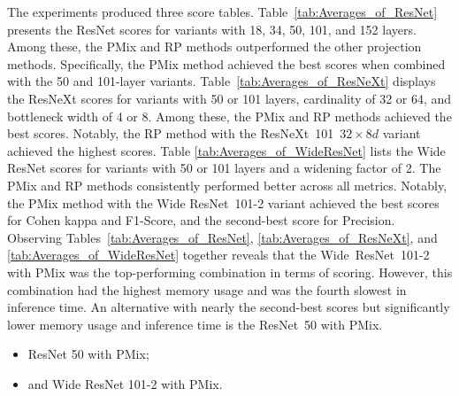 The experiments produced three score tables.
Table~\ref{tab:Averages_of_ResNet} presents the ResNet scores for variants with 18, 34, 50, 101, and 152 layers. Among these, the \gls{PMix} and \gls{RP} methods outperformed the other projection methods. Specifically, the \gls{PMix} method achieved the best scores when combined with the 50 and 101-layer variants.
Table~\ref{tab:Averages_of_ResNeXt} displays the ResNeXt scores for variants with 50 or 101 layers, cardinality of 32 or 64, and bottleneck width of 4 or 8. Among these, the \gls{PMix} and \gls{RP} methods achieved the best scores. Notably, the \gls{RP} method with the \mbox{ResNeXt 101 $32\times 8d$} variant achieved the highest scores.
Table \ref{tab:Averages_of_WideResNet} lists the Wide ResNet scores for variants with 50 or 101 layers and a widening factor of 2. The \gls{PMix} and \gls{RP} methods consistently performed better across all metrics. Notably, the \gls{PMix} method with the Wide \mbox{ResNet 101-2} variant achieved the best scores for Cohen kappa and F1-Score, and the second-best score for Precision.
Observing Tables~\ref{tab:Averages_of_ResNet}, \ref{tab:Averages_of_ResNeXt}, and \ref{tab:Averages_of_WideResNet} together reveals that the \mbox{Wide ResNet 101-2} with \gls{PMix} was the top-performing combination in terms of scoring. However, this combination had the highest memory usage and was the fourth slowest in inference time. An alternative with nearly the second-best scores but significantly lower memory usage and inference time is the \mbox{ResNet 50} with \gls{PMix}.  
\begin{itemize}
	\item ResNet 50 with \gls{PMix}; 
	\item and Wide ResNet 101-2 with \gls{PMix}. 
\end{itemize}



